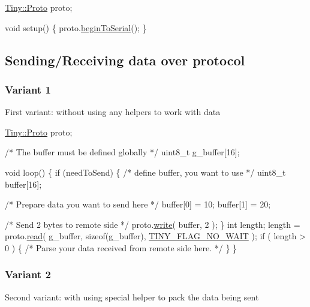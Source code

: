 \begin{DoxyCode}
\hyperlink{classTiny_1_1Proto}{Tiny::Proto} proto;

\textcolor{keywordtype}{void} setup()
\{
    proto.\hyperlink{classTiny_1_1Proto_a1dcad822337b6155148b1da9222fdd82}{beginToSerial}();
\}
\end{DoxyCode}
\hypertarget{arduino_arduino_tiny_send}{}\subsection{Sending/\+Receiving data over protocol}\label{arduino_arduino_tiny_send}
\hypertarget{arduino_arduino_tiny_send_receive1}{}\subsubsection{Variant 1}\label{arduino_arduino_tiny_send_receive1}
First variant\+: without using any helpers to work with data 
\begin{DoxyCode}
\hyperlink{classTiny_1_1Proto}{Tiny::Proto} proto;

\textcolor{comment}{/* The buffer must be defined globally */}
uint8\_t g\_buffer[16];

\textcolor{keywordtype}{void} loop()
\{
    \textcolor{keywordflow}{if} (needToSend)
    \{
        \textcolor{comment}{/* define buffer, you want to use */}
        uint8\_t buffer[16];

        \textcolor{comment}{/* Prepare data you want to send here */}
        buffer[0] = 10;
        buffer[1] = 20;

        \textcolor{comment}{/* Send 2 bytes to remote side */}
        proto.\hyperlink{classTiny_1_1Proto_a46fbc8b8681431b9b0a9a4b953a8dc33}{write}( buffer, 2 );
    \}
    \textcolor{keywordtype}{int} length;
    length = proto.\hyperlink{classTiny_1_1Proto_acc00ac10509eaa11a83b0b88a2278b3e}{read}( g\_buffer, \textcolor{keyword}{sizeof}(g\_buffer), \hyperlink{group__FLAGS__GROUP_gadadd60eb21d7949e6d097ad36aab9b2e}{TINY\_FLAG\_NO\_WAIT} );
    \textcolor{keywordflow}{if} ( length > 0 )
    \{
        \textcolor{comment}{/* Parse your data received from remote side here. */}
    \}
\}
\end{DoxyCode}
\hypertarget{arduino_arduino_tiny_send_receive2}{}\subsubsection{Variant 2}\label{arduino_arduino_tiny_send_receive2}
Second variant\+: with using special helper to pack the data being sent 
